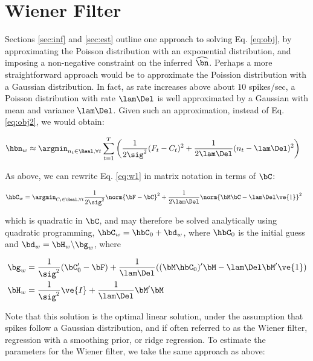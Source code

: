\appendix

\section{Wiener Filter}

Sections \ref{sec:inf} and \ref{sec:est} outline one approach to solving Eq. \eqref{eq:obj}, by approximating the Poisson distribution with an exponential distribution, and imposing a non-negative constraint on the inferred $\hnm$.  Perhaps a more straightforward approach would be to approximate the Poission distribution with a Gaussian distribution.  In fact, as rate increases above about $10$ spikes/sec, a Poisson distribution with rate $\lam \Del$ is well approximated by a Gaussian with mean and variance $\lam \Del$.  Given such an approximation, instead of Eq. \eqref{eq:obj2}, we would obtain:

\begin{align} \label{eq:w1}
\hbn_{w} &\approx \argmin_{n_t \in \Real, \forall t} \sum_{t=1}^T \bigg(\frac{1}{2\sig^2} (F_t-C_t)^2 + \frac{1}{2 \lam \Del} (n_t - \lam \Del)^2\bigg)%
\end{align}

\noindent As above, we can rewrite Eq. \eqref{eq:w1} in matrix notation in terms of $\bC$:

\begin{align}   \label{eq:w2}
\hbC_{w}&= \argmin_{C_t \in \Real, \forall t} \frac{1}{2\sig^2} \norm{\bF - \bC}^2 + \frac{1}{2\lam\Del} \norm{\bM \bC - \lam\Del\ve{1}}^2 
\end{align}

\noindent which is quadratic in $\bC$, and may therefore be solved analytically using quadratic programming, $\hbC_w = \hbC_0 + \bd_w$, where $\hbC_0$ is the initial guess and $\bd_w=\bH_w \backslash \bg_w$, where

\begin{align}
\bg_w &= \frac{1}{\sig^2} (\bC_0' - \bF) + \frac{1}{\lam\Del} ( (\bM \hbC_0)' \bM - \lam\Del \bM' \ve{1}) \\
\bH_w &= \frac{1}{\sig^2} \ve{I} + \frac{1}{\lam\Del} \bM' \bM
\end{align}

Note that this solution is the optimal linear solution, under the assumption that spikes follow a Gaussian distribution, and if often referred to as the Wiener filter, regression with a smoothing prior, or ridge regression.  To estimate the parameters for the Wiener filter, we take the same approach as above:

